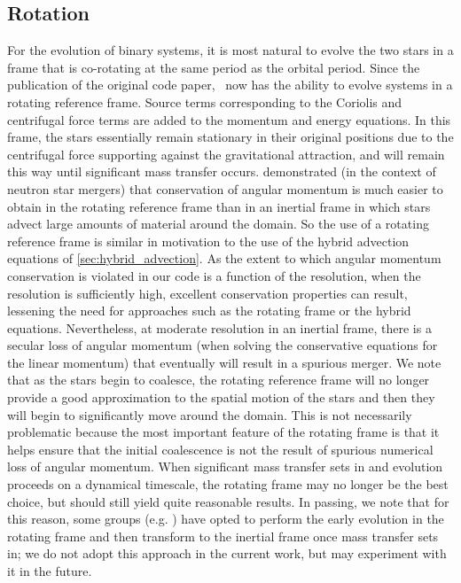 \documentclass[12pt]{article}
\begin{document}
\subsection{Rotation}
\label{sec:rotation}

For the evolution of binary systems, it is most natural to evolve the
two stars in a frame that is co-rotating at the same period as the
orbital period. Since the publication of the original code paper, \castro\
now has the ability to evolve systems in a rotating reference frame.
Source terms corresponding to the Coriolis and centrifugal force terms
are added to the momentum and energy equations. In this frame, the stars
essentially remain stationary in their original positions due to the
centrifugal force supporting against the gravitational attraction, and
will remain this way until significant mass transfer occurs. \cite{swc:2000}
demonstrated (in the context of neutron star mergers) that conservation of
angular momentum is much easier to obtain in the rotating reference frame
than in an inertial frame in which stars advect large amounts of material
around the domain. So the use of a rotating reference frame is similar in
motivation to the use of the hybrid advection equations of \autoref{sec:hybrid_advection}.
As the extent to which angular momentum conservation is violated in our code
is a function of the resolution, when the resolution is sufficiently high,
excellent conservation properties can result, lessening the need for
approaches such as the rotating frame or the hybrid equations. Nevertheless,
at moderate resolution in an inertial frame, there is a secular loss of angular
momentum (when solving the conservative equations for the linear momentum)
that eventually will result in a spurious merger.
We note that as the stars begin to coalesce, the rotating reference frame
will no longer provide a good approximation to the spatial motion of
the stars and then they will begin to significantly move around the
domain. This is not necessarily problematic because the most important
feature of the rotating frame is that it helps ensure that the initial
coalescence is not the result of spurious numerical loss of angular
momentum. When significant mass transfer sets in and evolution
proceeds on a dynamical timescale, the rotating frame may no longer be the
best choice, but should still yield quite reasonable results. In passing,
we note that for this reason, some groups (e.g. \citet{pakmor:2012:gadget})
have opted to perform the early evolution in the rotating frame and then
transform to the inertial frame once mass transfer sets in; we do not
adopt this approach in the current work, but may experiment with it in
the future.
\end{document}
